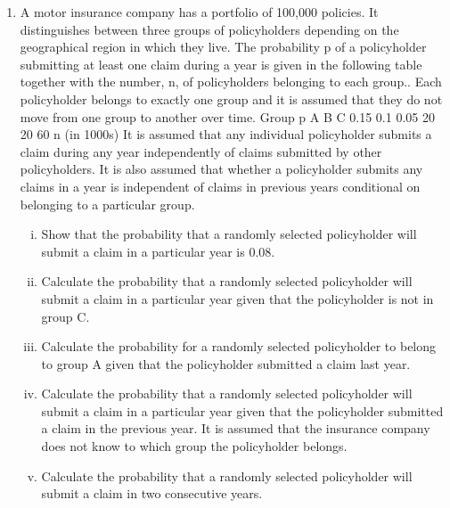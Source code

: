 \documentclass[a4paper,12pt]{article}
\begin{document}
\begin{enumerate}

\item %
A motor insurance company has a portfolio of 100,000 policies. It distinguishes
between three groups of policyholders depending on the geographical region in which they live. The probability p of a policyholder submitting at least one claim during a year is given in the following table together with the number, n, of policyholders belonging to each group.. Each policyholder belongs to exactly one group and it is
assumed that they do not move from one group to another over time.
Group
p
A
B
C
0.15 0.1 0.05
20 20 60
n (in 1000s)
It is assumed that any individual policyholder submits a claim during any year
independently of claims submitted by other policyholders. It is also assumed that
whether a policyholder submits any claims in a year is independent of claims in
previous years conditional on belonging to a particular group.

\begin{enumerate}[(i)]
\item Show that the probability that a randomly selected policyholder will submit a claim in a particular year is 0.08.

\item Calculate the probability that a randomly selected policyholder will submit a claim in a particular year given that the policyholder is not in group C.

\item Calculate the probability for a randomly selected policyholder to belong to
group A given that the policyholder submitted a claim last year.

\item Calculate the probability that a randomly selected policyholder will submit a
claim in a particular year given that the policyholder submitted a claim in the
previous year. It is assumed that the insurance company does not know to
which group the policyholder belongs.

\item Calculate the probability that a randomly selected policyholder will submit a
claim in two consecutive years.
\end{enumerate}


\end{enumerate}
\end{document}
